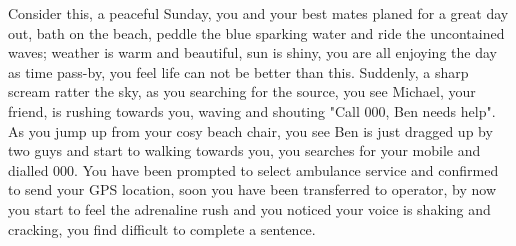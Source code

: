 Consider this, a peaceful Sunday, you and your best mates planed for a great day out, bath on the beach, peddle the blue sparking water and ride the uncontained waves; weather is warm and beautiful, sun is shiny, you are all enjoying the day as time pass-by, you feel life can not be better than this. Suddenly, a sharp scream ratter the sky, as you searching for the source, you see Michael, your friend, is rushing towards you, waving and shouting "Call 000, Ben needs help". As you jump up from your cosy beach chair, you see Ben is just dragged up by two guys and start to walking towards you, you searches for your mobile and dialled 000. You have been prompted to select ambulance service and confirmed to send your GPS location, soon you have been transferred to operator, by now you start to feel the adrenaline rush and you noticed your voice is shaking and cracking, you find difficult to complete a sentence. 